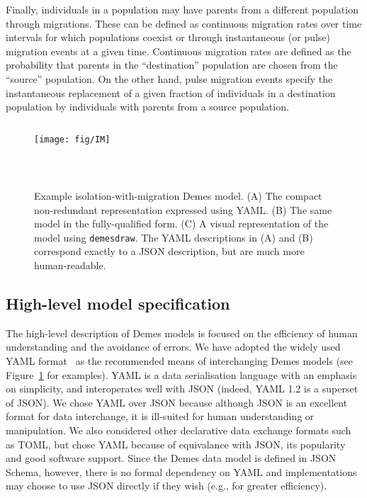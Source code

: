 \documentclass[11pt]{article}
\begin{document}
Finally, individuals in a population may have parents from a different
population through migrations. These can be defined as continuous migration
rates over time intervals for which populations coexist or through
instantaneous (or pulse) migration events at a given time. Continuous migration
rates are defined as the probability that parents in the ``destination''
population are chosen from the ``source'' population.
On the other hand, pulse
migration events specify the instantaneous replacement of a given fraction of
individuals in a destination population by individuals with parents from a
source population.

\begin{figure}
\begin{minipage}{0.44\textwidth}
\begin{tcolorbox}
\inputminted[fontsize=\scriptsize,linenos,numbersep=5pt]{yaml}{models/IM.yaml}
\end{tcolorbox}
\begin{tcolorbox}
\texttt{[image: fig/IM]}
\end{tcolorbox}
\end{minipage}\hfill
\begin{minipage}{0.54\textwidth}
\begin{tcolorbox}
\inputminted[fontsize=\scriptsize,linenos,numbersep=5pt]{yaml}{models/IM-resolved.yaml}
\end{tcolorbox}
\end{minipage}\\
\caption{\label{fig-example}
Example isolation-with-migration Demes model. (A) The compact non-redundant
representation expressed using YAML. (B) The same model in the fully-qualified
form. (C) A visual representation of the model using \texttt{demesdraw}.
The YAML descriptions in (A) and (B) correspond exactly to a JSON description,
but are much more human-readable.
}
\end{figure}


\subsection*{High-level model specification}

The high-level description of Demes models is focused on the efficiency of
human understanding and the avoidance of errors. We have adopted the widely
used YAML format~\citep{ben2009yaml} as the recommended means of interchanging
Demes models (see Figure~\ref{fig-example} for examples). YAML is a data
serialisation language with an emphasis on simplicity, and interoperates well
with JSON (indeed, YAML 1.2 is a superset of JSON). We chose YAML over JSON
because although JSON is an excellent format for data interchange, it is
ill-suited for human understanding or manipulation. We also considered other
declarative data exchange formats such as TOML,
but chose YAML because of equivalance with JSON,
its popularity and good software support.
Since the Demes data model is defined in JSON Schema,
however, there is no formal dependency on YAML and implementations may choose
to use JSON directly if they wish (e.g., for greater efficiency).
\end{document}
